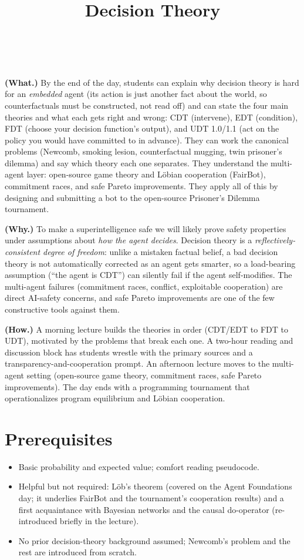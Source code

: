 \documentclass[11pt]{article}
\title{Decision Theory}
\author{
  \authorname{Daniel C}
  \and
  \authorname{Satya Benson}\\
  \affiliation{Williams College}
}
\begin{document}
\maketitle

\begin{learningoutcomes}
\textbf{(What.)} By the end of the day, students can explain why decision theory is hard for an \emph{embedded} agent (its action is just another fact about the world, so counterfactuals must be constructed, not read off) and can state the four main theories and what each gets right and wrong: CDT (intervene), EDT (condition), FDT (choose your decision function's output), and UDT 1.0/1.1 (act on the policy you would have committed to in advance). They can work the canonical problems (Newcomb, smoking lesion, counterfactual mugging, twin prisoner's dilemma) and say which theory each one separates. They understand the multi-agent layer: open-source game theory and Löbian cooperation (FairBot), commitment races, and safe Pareto improvements. They apply all of this by designing and submitting a bot to the open-source Prisoner's Dilemma tournament.

\textbf{(Why.)} To make a superintelligence safe we will likely prove safety properties under assumptions about \emph{how the agent decides}. Decision theory is a \emph{reflectively-consistent degree of freedom}: unlike a mistaken factual belief, a bad decision theory is not automatically corrected as an agent gets smarter, so a load-bearing assumption (``the agent is CDT'') can silently fail if the agent self-modifies. The multi-agent failures (commitment races, conflict, exploitable cooperation) are direct AI-safety concerns, and safe Pareto improvements are one of the few constructive tools against them.

\textbf{(How.)} A morning lecture builds the theories in order (CDT/EDT to FDT to UDT), motivated by the problems that break each one. A two-hour reading and discussion block has students wrestle with the primary sources and a transparency-and-cooperation prompt. An afternoon lecture moves to the multi-agent setting (open-source game theory, commitment races, safe Pareto improvements). The day ends with a programming tournament that operationalizes program equilibrium and Löbian cooperation.
\end{learningoutcomes}

\section{Prerequisites}
\begin{itemize}
\item
  Basic probability and expected value; comfort reading pseudocode.
\item
  Helpful but not required: Löb's theorem (covered on the Agent Foundations day; it underlies FairBot and the tournament's cooperation results) and a first acquaintance with Bayesian networks and the causal do-operator (re-introduced briefly in the lecture).
\item
  No prior decision-theory background assumed; Newcomb's problem and the rest are introduced from scratch.
\end{itemize}
\end{document}
